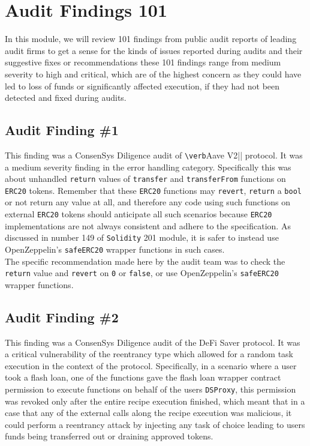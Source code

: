 \chapter{Audit Findings 101}

In this module, we will review 101 findings from public audit reports of leading audit firms to get a sense for the kinds of issues reported during audits and their suggestive fixes or recommendations these 101 findings range from medium severity to high and critical, which are of the highest concern as they could have led to loss of funds or significantly affected execution, if they had not been detected and fixed during audits.

\section{Audit Finding \#1}

This finding was a ConsenSys Diligence audit of \verb|\verb|Aave V2|| protocol. It was a medium severity finding in the error handling category. Specifically this was about unhandled \verb|return| values of \verb|transfer| and \verb|transferFrom| functions on \verb|ERC20| tokens. Remember that these \verb|ERC20| functions may \verb|revert|, \verb|return| a \verb|bool| or not return any value at all, and therefore any code using such functions on external \verb|ERC20| tokens should anticipate all such scenarios because \verb|ERC20| implementations are not always consistent and adhere to the specification. As discussed in number 149 of \verb|Solidity| 201 module, it is safer to instead use OpenZeppelin's \verb|safeERC20| wrapper functions in such cases.\\

The specific recommendation made here by the audit team was to check the \verb|return| value and \verb|revert| on \verb|0| or \verb|false|, or use OpenZeppelin's \verb|safeERC20| wrapper functions.

\section{Audit Finding \#2}

This finding was a ConsenSys Diligence audit of the DeFi Saver protocol. It was a critical vulnerability of the reentrancy type which allowed for a random task execution in the context of the protocol. Specifically, in a scenario where a user took a flash loan, one of the functions gave the flash loan wrapper contract permission to execute functions on behalf of the users \verb|DSProxy|, this permission was revoked only after the entire recipe execution finished, which meant that in a case that any of the external calls along the recipe execution was malicious, it could perform a reentrancy attack by injecting any task of choice leading to users funds being transferred out or draining approved tokens.\\


